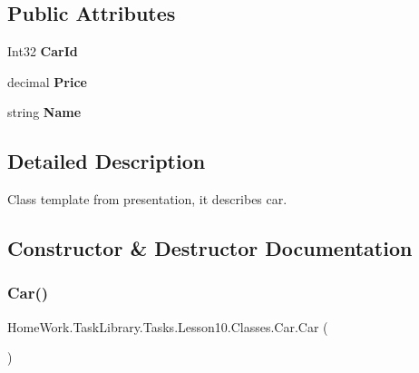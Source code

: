 \subsection*{Public Attributes}
\begin{DoxyCompactItemize}
\item 
\mbox{\label{class_home_work_1_1_task_library_1_1_tasks_1_1_lesson10_1_1_classes_1_1_car_af7367142b16a2b92f2dc9e41c4b42dcd}} 
Int32 {\bfseries Car\+Id}
\item 
\mbox{\label{class_home_work_1_1_task_library_1_1_tasks_1_1_lesson10_1_1_classes_1_1_car_a5008cab46400b1d7730e4c11e93542b1}} 
decimal {\bfseries Price}
\item 
\mbox{\label{class_home_work_1_1_task_library_1_1_tasks_1_1_lesson10_1_1_classes_1_1_car_a9b558bd1f8df832bbdc7e98ce830d123}} 
string {\bfseries Name}
\end{DoxyCompactItemize}


\subsection{Detailed Description}
Class template from presentation, it describes car. 



\subsection{Constructor \& Destructor Documentation}
\mbox{\label{class_home_work_1_1_task_library_1_1_tasks_1_1_lesson10_1_1_classes_1_1_car_ad8181b0934f020d1d961d32571a90966}} 
\subsubsection{\texorpdfstring{Car()}{Car()}\hspace{0.1cm}{\footnotesize\ttfamily [1/2]}}
{\footnotesize\ttfamily Home\+Work.\+Task\+Library.\+Tasks.\+Lesson10.\+Classes.\+Car.\+Car (\begin{DoxyParamCaption}{ }\end{DoxyParamCaption})}



